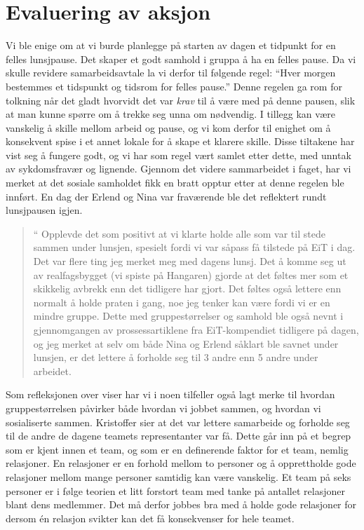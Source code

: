 \section{Evaluering av aksjon} 

Vi ble enige om at vi burde planlegge på starten av dagen et tidpunkt for en felles lunsjpause. Det skaper et godt samhold i gruppa å ha en felles pause.  Da vi skulle revidere samarbeidsavtale la vi derfor til følgende regel:  ``Hver morgen bestemmes et tidspunkt og tidsrom for felles pause.'' Denne regelen ga rom for tolkning når det gladt hvorvidt det var \emph{krav} til å være med på denne pausen, slik at man kunne spørre om å trekke seg unna om nødvendig. I tillegg kan være vanskelig å skille mellom arbeid og pause, og vi kom derfor til enighet om å konsekvent spise i et annet lokale for å skape et klarere skille. Disse tiltakene har vist seg å fungere godt, og vi har som regel vært samlet etter dette, med unntak av sykdomsfravær og lignende. Gjennom det videre sammarbeidet i faget, har vi merket at det sosiale samholdet fikk en bratt opptur etter at denne regelen ble innført. En dag der Erlend og Nina var fraværende ble det reflektert rundt lunsjpausen igjen.

\begin{quote}``
Opplevde det som positivt at vi klarte holde alle som var til stede sammen under lunsjen, spesielt fordi vi var såpass få tilstede på EiT i dag. Det var flere ting jeg merket meg med dagens lunsj. Det å komme seg ut av realfagsbygget (vi spiste på Hangaren) gjorde at det føltes mer som et skikkelig avbrekk enn det tidligere har gjort. Det føltes også lettere enn normalt å holde praten i gang, noe jeg tenker kan være fordi vi er en mindre gruppe. Dette med gruppestørrelser og samhold ble også nevnt i gjennomgangen av prossessartiklene fra EiT-kompendiet tidligere på dagen, og jeg merket at selv om både Nina og Erlend såklart ble savnet under lunsjen, er det lettere å forholde seg til 3 andre enn 5 andre under arbeidet.
\end{quote} 

Som refleksjonen over viser har vi i noen tilfeller også lagt merke til hvordan gruppestørrelsen påvirker både hvordan vi jobbet sammen, og hvordan vi sosialiserte sammen. Kristoffer sier at det var lettere samarbeide og forholde seg til de andre de dagene teamets representanter var få. Dette går inn på et begrep som er kjent innen et team, og som er en definerende faktor for et team, nemlig relasjoner. 
En relasjoner er en forhold mellom to personer og å opprettholde gode relasjoner mellom mange personer samtidig
kan være vanskelig. Et team på seks personer er i følge teorien  \cite{Artikkel4} et litt forstort team med tanke på antallet relasjoner
blant dens medlemmer. Det må derfor jobbes bra med å holde gode relasjoner for dersom én relasjon svikter kan det få 
konsekvenser for hele teamet. 

